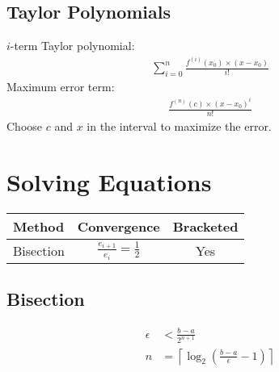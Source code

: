\documentclass[12pt]{article}
\newcommand{\round}   [1]{\left(       #1 \right)}
\newcommand{\ceiling} [1]{\left\lceil  #1 \right\rceil}
\begin{document}
\subsection*{Taylor Polynomials}
$i$-term Taylor polynomial:
\begin{align*}
    \sum_{i=0}^n \frac{f^{(i)}(x_0) \times (x - x_0)}{i!}
\end{align*}
Maximum error term:
\begin{align*}
    \frac{f^{(n)}(c) \times (x - x_0)^i}{n!}
\end{align*}
Choose $c$ and $x$ in the interval to maximize the error.

\section*{Solving Equations}

\begin{center}
    \begin{tabular}{l|cc}
        Method & Convergence & Bracketed \\ \hline
        Bisection & $\frac{e_{i+1}}{e_i} = \frac{1}{2}$ & Yes
    \end{tabular}
\end{center}

\subsection*{Bisection}
\begin{align*}
    \epsilon &< \frac{b - a}{2^{n + 1}} \\
    n &= \ceiling{\log_2 \round{\frac{b - a}{\epsilon} - 1}}
\end{align*}
\end{document}
